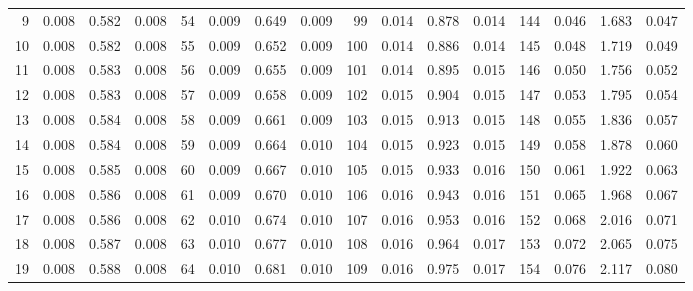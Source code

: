 \begin{table}
{\begin{tabular}{rrrr|rrrr|rrrr|crrr}
  9 & \tiny{  0.008} &   0.582 & \tiny{  0.008} &  54 & \tiny{  0.009} &   0.649 & \tiny{  0.009} &  99 & \tiny{  0.014} &   0.878 & \tiny{  0.014} & 144 & \tiny{  0.046} &   1.683 & \tiny{  0.047}\\
 10 & \tiny{  0.008} &   0.582 & \tiny{  0.008} &  55 & \tiny{  0.009} &   0.652 & \tiny{  0.009} & 100 & \tiny{  0.014} &   0.886 & \tiny{  0.014} & 145 & \tiny{  0.048} &   1.719 & \tiny{  0.049}\\
 11 & \tiny{  0.008} &   0.583 & \tiny{  0.008} &  56 & \tiny{  0.009} &   0.655 & \tiny{  0.009} & 101 & \tiny{  0.014} &   0.895 & \tiny{  0.015} & 146 & \tiny{  0.050} &   1.756 & \tiny{  0.052}\\
 12 & \tiny{  0.008} &   0.583 & \tiny{  0.008} &  57 & \tiny{  0.009} &   0.658 & \tiny{  0.009} & 102 & \tiny{  0.015} &   0.904 & \tiny{  0.015} & 147 & \tiny{  0.053} &   1.795 & \tiny{  0.054}\\
 13 & \tiny{  0.008} &   0.584 & \tiny{  0.008} &  58 & \tiny{  0.009} &   0.661 & \tiny{  0.009} & 103 & \tiny{  0.015} &   0.913 & \tiny{  0.015} & 148 & \tiny{  0.055} &   1.836 & \tiny{  0.057}\\
 14 & \tiny{  0.008} &   0.584 & \tiny{  0.008} &  59 & \tiny{  0.009} &   0.664 & \tiny{  0.010} & 104 & \tiny{  0.015} &   0.923 & \tiny{  0.015} & 149 & \tiny{  0.058} &   1.878 & \tiny{  0.060}\\
 15 & \tiny{  0.008} &   0.585 & \tiny{  0.008} &  60 & \tiny{  0.009} &   0.667 & \tiny{  0.010} & 105 & \tiny{  0.015} &   0.933 & \tiny{  0.016} & 150 & \tiny{  0.061} &   1.922 & \tiny{  0.063}\\
 16 & \tiny{  0.008} &   0.586 & \tiny{  0.008} &  61 & \tiny{  0.009} &   0.670 & \tiny{  0.010} & 106 & \tiny{  0.016} &   0.943 & \tiny{  0.016} & 151 & \tiny{  0.065} &   1.968 & \tiny{  0.067}\\
 17 & \tiny{  0.008} &   0.586 & \tiny{  0.008} &  62 & \tiny{  0.010} &   0.674 & \tiny{  0.010} & 107 & \tiny{  0.016} &   0.953 & \tiny{  0.016} & 152 & \tiny{  0.068} &   2.016 & \tiny{  0.071}\\
 18 & \tiny{  0.008} &   0.587 & \tiny{  0.008} &  63 & \tiny{  0.010} &   0.677 & \tiny{  0.010} & 108 & \tiny{  0.016} &   0.964 & \tiny{  0.017} & 153 & \tiny{  0.072} &   2.065 & \tiny{  0.075}\\
 19 & \tiny{  0.008} &   0.588 & \tiny{  0.008} &  64 & \tiny{  0.010} &   0.681 & \tiny{  0.010} & 109 & \tiny{  0.016} &   0.975 & \tiny{  0.017} & 154 & \tiny{  0.076} &   2.117 & \tiny{  0.080}\\

\end{tabular}}
\end{table}
